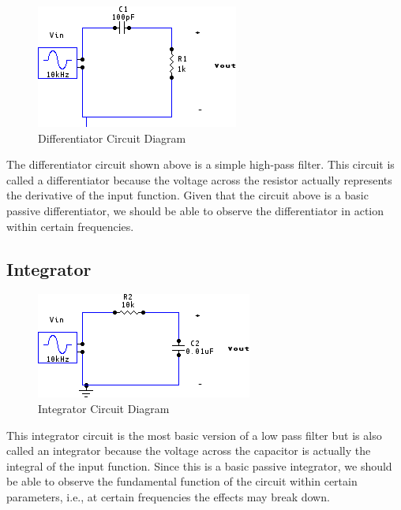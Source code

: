\documentclass[twocolumn,english]{IEEEtran}
\theoremstyle{plain}
\theoremstyle{plain}
\begin{document}
	\begin{figure}[H]
			\begin{centering}
			\begin{center}
			\includegraphics[width=.85\linewidth]{./Circuits/Differentiator.png}
			\caption{Differentiator Circuit Diagram}
			\label{diag:differentiator}
			\end{center}
			\par\end{centering}
	\end{figure}
	The differentiator circuit shown above is a simple high-pass filter.
	This circuit is called a differentiator because the voltage across the resistor actually represents the derivative of the input function.
	Given that the circuit above is a basic passive differentiator, we should be able to observe the differentiator in action within certain frequencies.\cite{wiki-differentiator}


	\subsection{Integrator}
	\begin{figure}[H]
			\begin{centering}
			\begin{center}
			\includegraphics[width=.85\linewidth]{./Circuits/Integrator.png}
			\caption{Integrator Circuit Diagram}
			\label{diag:integrator}
			\end{center}
			\par\end{centering}
	\end{figure}
	This integrator circuit is the most basic version of a low pass filter but is also called an integrator because the voltage across the capacitor is actually the integral of the input function.
	Since this is a basic passive integrator, we should be able to observe the fundamental function of the circuit within certain parameters, i.e., at certain frequencies the effects may break down.\cite{wiki-integrator}
\end{document}
